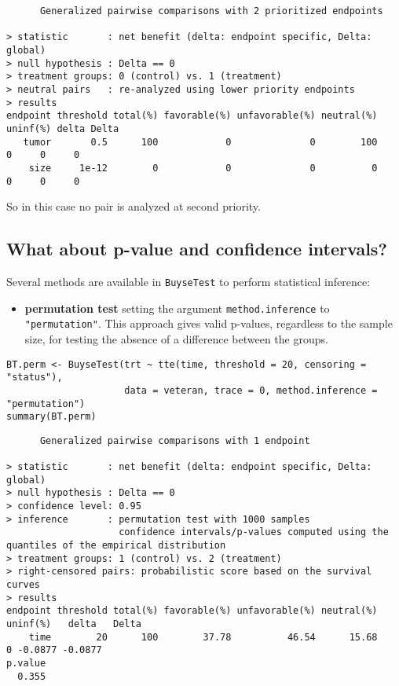 \documentclass[12pt]{article}
\begin{document}
\begin{verbatim}
      Generalized pairwise comparisons with 2 prioritized endpoints

> statistic       : net benefit (delta: endpoint specific, Delta: global) 
> null hypothesis : Delta == 0 
> treatment groups: 0 (control) vs. 1 (treatment) 
> neutral pairs   : re-analyzed using lower priority endpoints
> results
endpoint threshold total(%) favorable(%) unfavorable(%) neutral(%) uninf(%) delta Delta
   tumor       0.5      100            0              0        100        0     0     0
    size     1e-12        0            0              0          0        0     0     0
\end{verbatim}

So in this case no pair is analyzed at second priority.

\clearpage

\subsection{What about p-value and confidence intervals?}
\label{sec:org527bec9}

Several methods are available in \texttt{BuyseTest} to perform statistical inference:
\begin{itemize}
\item \textbf{permutation test} setting the argument \texttt{method.inference} to
\texttt{"permutation"}. This approach gives valid p-values, regardless to
the sample size, for testing the absence of a difference between the
groups.
\end{itemize}
\lstset{language=r,label= ,caption= ,captionpos=b,numbers=none}
\begin{lstlisting}
BT.perm <- BuyseTest(trt ~ tte(time, threshold = 20, censoring = "status"),
					 data = veteran, trace = 0, method.inference = "permutation") 
summary(BT.perm)
\end{lstlisting}

\begin{verbatim}
      Generalized pairwise comparisons with 1 endpoint

> statistic       : net benefit (delta: endpoint specific, Delta: global) 
> null hypothesis : Delta == 0 
> confidence level: 0.95 
> inference       : permutation test with 1000 samples 
                    confidence intervals/p-values computed using the quantiles of the empirical distribution 
> treatment groups: 1 (control) vs. 2 (treatment) 
> right-censored pairs: probabilistic score based on the survival curves
> results
endpoint threshold total(%) favorable(%) unfavorable(%) neutral(%) uninf(%)   delta   Delta
    time        20      100        37.78          46.54      15.68        0 -0.0877 -0.0877
p.value 
  0.355
\end{verbatim}
\end{document}
